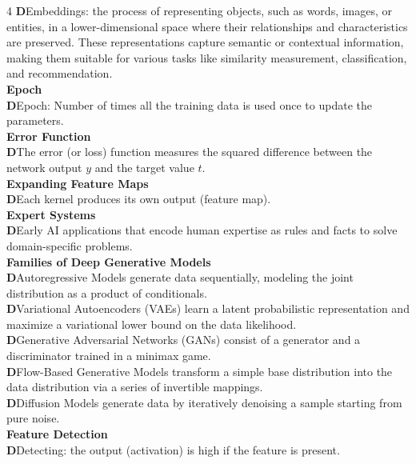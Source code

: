 \documentclass[8pt]{extarticle}
\newcommand{\dtag}{\textcolor{definitioncolor}{\tiny\textbf{D}}\;}
\begin{document}
\begin{multicols}{4}
\dtag Embeddings: the process of representing objects, such as words, images, or entities, in a lower-dimensional space where their relationships and characteristics are preserved. These representations capture semantic or contextual information, making them suitable for various tasks like similarity measurement, classification, and recommendation.\\
\vspace{2pt}\textbf{Epoch}\\
\dtag Epoch: Number of times all the training data is used once to update the parameters.\\
\vspace{2pt}\textbf{Error Function}\\
\dtag The error (or loss) function measures the squared difference between the network output $y$ and the target value $ t$.\\
\vspace{2pt}\textbf{Expanding Feature Maps}\\
\dtag Each kernel produces its own output (feature map).\\
\vspace{2pt}\textbf{Expert Systems}\\
\dtag Early AI applications that encode human expertise as rules and facts to solve domain-specific problems.\\
\vspace{2pt}\textbf{Families of Deep Generative Models}\\
\dtag Autoregressive Models generate data sequentially, modeling the joint distribution as a product of conditionals.\\
\dtag Variational Autoencoders (VAEs) learn a latent probabilistic representation and maximize a variational lower bound on the data likelihood.\\
\dtag Generative Adversarial Networks (GANs) consist of a generator and a discriminator trained in a minimax game.\\
\dtag Flow-Based Generative Models transform a simple base distribution into the data distribution via a series of invertible mappings.\\
\dtag Diffusion Models generate data by iteratively denoising a sample starting from pure noise.\\
\vspace{2pt}\textbf{Feature Detection}\\
\dtag Detecting: the output (activation) is high if the feature is present.\\


\end{multicols}
\end{document}

